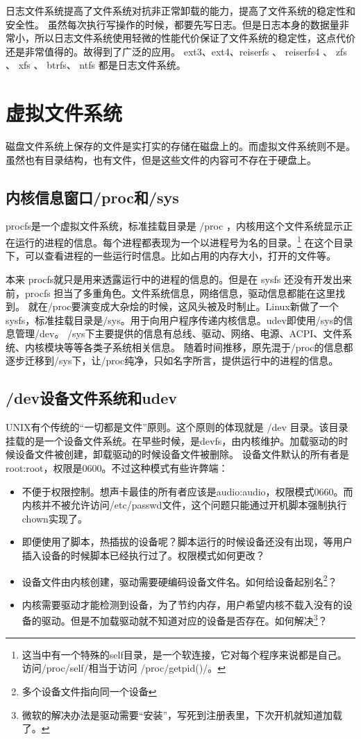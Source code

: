 日志文件系统提高了文件系统对抗非正常卸载的能力，提高了文件系统的稳定性和安全性。
虽然每次执行写操作的时候，都要先写日志。但是日志本身的数据量非常小，所以日志文件系统使用轻微的性能代价保证了文件系统的稳定性，这点代价还是非常值得的。故得到了广泛的应用。
ext3、ext4、reiserfs 、 reiserfs4 、 zfs 、 xfs 、 btrfs、 ntfs 都是日志文件系统。

\section{虚拟文件系统}

磁盘文件系统上保存的文件是实打实的存储在磁盘上的。而虚拟文件系统则不是。虽然也有目录结构，也有文件，但是这些文件的内容可不存在于硬盘上。


\subsection{内核信息窗口/proc和/sys}

procfs是一个虚拟文件系统，标准挂载目录是 /proc ，内核用这个文件系统显示正在运行的进程的信息。每个进程都表现为一个以进程号为名的目录。\footnote{ 这当中有一个特殊的self目录，是一个软连接，它对每个程序来说都是自己。访问/proc/self/相当于访问 /proc/getpid()/。}
在这个目录下，可以查看进程的一些运行时信息。比如占用的内存大小，打开的文件等。

本来 procfs就只是用来透露运行中的进程的信息的。但是在 sysfs 还没有开发出来前，procfs 担当了多重角色。文件系统信息，网络信息，驱动信息都能在这里找到。
就在/proc要演变成大杂烩的时候，这风头被及时制止。Linux新做了一个sysfs，标准挂载目录是/sys。用于向用户程序传递内核信息。udev即使用/sys的信息管理/dev。
/sys下主要提供的信息有总线、驱动、网络、电源、ACPI、文件系统、内核模块等等各类子系统相关信息。
随着时间推移，原先混于/proc的信息都逐步迁移到/sys下，让/proc纯净，只如名字所言，提供运行中的进程的信息。

\subsection{/dev设备文件系统和udev}

UNIX有个传统的“一切都是文件”原则。这个原则的体现就是 /dev 目录。该目录挂载的是一个设备文件系统。在早些时候，是devfs，由内核维护。加载驱动的时候设备文件被创建，卸载驱动的时候设备文件被删除。
设备文件默认的所有者是root:root，权限是0600。不过这种模式有些许弊端：

\begin{itemize}
\item 不便于权限控制。想声卡最佳的所有者应该是audio:audio，权限模式0660。而内核并不被允许访问/etc/passwd文件，这个问题只能通过开机脚本强制执行chown实现了。
\item 即便使用了脚本，热插拔的设备呢？脚本运行的时候设备还没有出现，等用户插入设备的时候脚本已经执行过了。权限模式如何更改？
\item 设备文件由内核创建，驱动需要硬编码设备文件名。如何给设备起别名\footnote{多个设备文件指向同一个设备}？
\item 内核需要驱动才能检测到设备，为了节约内存，用户希望内核不载入没有的设备的驱动。但是不加载驱动就不知道对应的设备是否存在。如何解决\footnote{微软的解决办法是驱动需要“安装”，写死到注册表里，下次开机就知道加载了。}？
\end{itemize}

